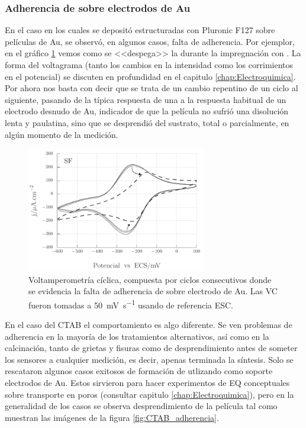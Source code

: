 		\subsubsection{Adherencia de \pdm\space sobre electrodos de Au}

			En el caso en los cuales se depositó \pdm\space estructuradas con Pluronic F127 sobre películas de Au, se observó, en algunos casos, falta de adherencia. Por ejemplor, en el gráfico \ref{fig:adherencia_F127} vemos como se <<despega>> la \pdm\space durante la impregnación con \aminorutenio. La forma del voltagrama (tanto los cambios en la intensidad como los corrimientos en el potencial) se discuten en profundidad en el capitulo \ref{chap:Electroquimica}. Por ahora nos basta con decir que se trata de un cambio repentino de un ciclo al siguiente, pasando de la típica respuesta de una \pdm\space a la respuesta habitual de un electrodo desnudo de Au, indicador de que la película no sufrió una disolución lenta y paulatina, sino que se desprendió del sustrato, total o parcialmente, en algún momento de la medición.
			
				\begin{figure}[th]
				 	   	    \begin{center} 
				        	\includegraphics[width=0.70\textwidth]{Graficos/Adherencia_F127.pdf}
				       		\caption[Adherencia de \pdmF \space sobre una película delgada de Au.]{Voltamperometría cíclica, compuesta por ciclos consecutivos donde se evidencia la falta de adherencia de \pdmF \space sobre electrodo de Au. Las VC fueron tomadas a \SI{50}{\milli\volt.\second^{-1}} usando de referencia ESC.}
				         	\label{fig:adherencia_F127}
				     		\end{center}
				     		\end{figure}

			En el caso del CTAB el comportamiento es algo diferente. Se ven problemas de adherencia en la mayoría de los tratamientos alternativos, así como en la calcinación, tanto de grietas y fisuras como de desprendimiento antes de someter los sensores a cualquier medición, es decir, apenas terminada la síntesis. Solo se rescataron algunos casos exitosos de formación de \pdmC\space utlizando como soporte electrodos de Au. Estos sirvieron para hacer experimentos de EQ conceptuales sobre transporte en poros (consultar capitulo \ref{chap:Electroquimica}), pero en la generalidad de los casos se observa desprendimiento de la película tal como muestran las imágenes de la figura \ref{fig:CTAB_adherencia}.
	     
